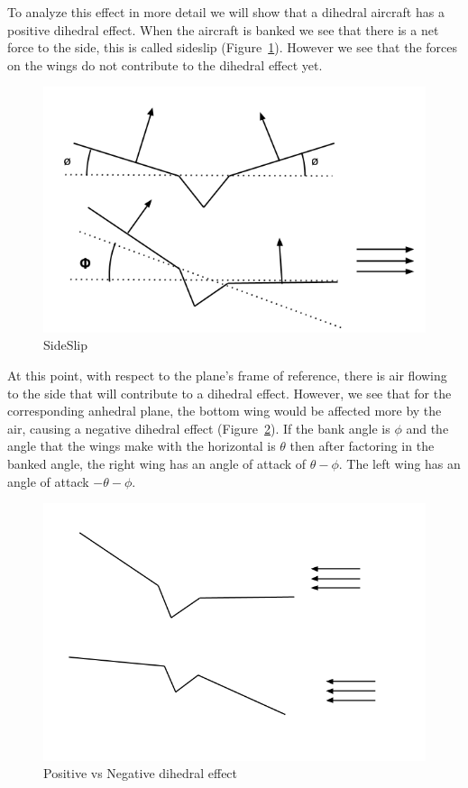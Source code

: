 To analyze this effect in more detail we will show that a dihedral aircraft has 
a positive dihedral effect. When the aircraft is banked we see that there is a net force
to the side, this is called sideslip (Figure~\ref{fig:dihedral1}). 
However we see that the forces on the wings do not 
contribute to the dihedral effect yet.


\begin{figure}[hl]
  \centering
    \includegraphics[scale=.5]{figures/dihedral1.png}
    \caption{SideSlip}
  \label{fig:dihedral1}
\end{figure}

At this point, with respect to the plane's frame of reference, there is air flowing 
to the side that will contribute to a dihedral effect. However, we see that for the
corresponding anhedral plane, the bottom wing would be affected more by the air, causing
a negative dihedral effect (Figure~\ref{fig:dihedral2}). If the bank angle is $\phi$ and
the angle that the wings make with the horizontal is $\theta$ then after factoring in
the banked angle, the right wing has an angle of attack of  $\theta - \phi$.
The left wing has an angle of attack $- \theta - \phi$.

\begin{figure}[hl]
  \centering
    \includegraphics[scale=.5]{figures/dihedral2.png}
    \caption{Positive vs Negative dihedral effect}
  \label{fig:dihedral2}
\end{figure}

